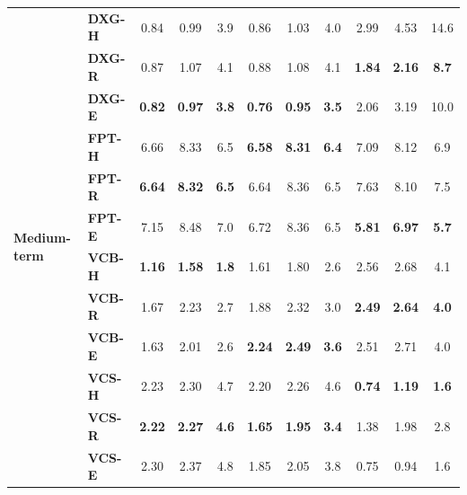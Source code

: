 \begin{table}[!h]
\begin{tabular}{llccc|ccc|ccc}
\multirow{12}{*}{\textbf{Medium-term}}
& \textbf{DXG-H} & 0.84 & 0.99 & 3.9 & 0.86 & 1.03 & 4.0 & 2.99 & 4.53 & 14.6 \\
& \textbf{DXG-R} & 0.87 & 1.07 & 4.1 & 0.88 & 1.08 & 4.1 & \textbf{1.84} & \textbf{2.16} & \textbf{8.7} \\
& \textbf{DXG-E} & \textbf{0.82} & \textbf{0.97} & \textbf{3.8} & \textbf{0.76} & \textbf{0.95} & \textbf{3.5} & 2.06 & 3.19 & 10.0 \\
& \textbf{FPT-H} & 6.66 & 8.33 & 6.5 & \textbf{6.58} & \textbf{8.31} & \textbf{6.4} & 7.09 & 8.12 & 6.9 \\
& \textbf{FPT-R} & \textbf{6.64} & \textbf{8.32} & \textbf{6.5} & 6.64 & 8.36 & 6.5 & 7.63 & 8.10 & 7.5 \\
& \textbf{FPT-E} & 7.15 & 8.48 & 7.0 & 6.72 & 8.36 & 6.5 & \textbf{5.81} & \textbf{6.97} & \textbf{5.7} \\
& \textbf{VCB-H} & \textbf{1.16} & \textbf{1.58} & \textbf{1.8} & 1.61 & 1.80 & 2.6 & 2.56 & 2.68 & 4.1 \\
& \textbf{VCB-R} & 1.67 & 2.23 & 2.7 & 1.88 & 2.32 & 3.0 & \textbf{2.49} & \textbf{2.64} & \textbf{4.0} \\
& \textbf{VCB-E} & 1.63 & 2.01 & 2.6 & \textbf{2.24} & \textbf{2.49} & \textbf{3.6} & 2.51 & 2.71 & 4.0 \\
& \textbf{VCS-H} & 2.23 & 2.30 & 4.7 & 2.20 & 2.26 & 4.6 & \textbf{0.74} & \textbf{1.19} & \textbf{1.6} \\
& \textbf{VCS-R} & \textbf{2.22} & \textbf{2.27} & \textbf{4.6} & \textbf{1.65} & \textbf{1.95} & \textbf{3.4} & 1.38 & 1.98 & 2.8 \\
& \textbf{VCS-E} & 2.30 & 2.37 & 4.8 & 1.85 & 2.05 & 3.8 & 0.75 & 0.94 & 1.6 \\
\midrule


\end{tabular}
\end{table}
